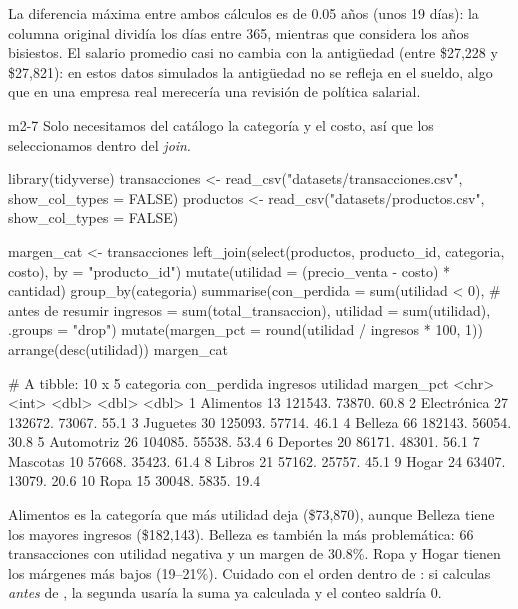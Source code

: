 La diferencia máxima entre ambos cálculos es de 0.05 años (unos 19
días): la columna original dividía los días entre 365, mientras que
 considera los años bisiestos. El salario promedio
casi no cambia con la antigüedad (entre \$27,228 y \$27,821): en estos datos
simulados la antigüedad no se refleja en el sueldo, algo que en una empresa
real merecería una revisión de política salarial.


\begin{solucion}{m2-7}
Solo necesitamos del catálogo la categoría y el costo, así que los
seleccionamos dentro del \emph{join}.
\end{solucion}

\begin{rcode}
library(tidyverse)
transacciones <- read_csv("datasets/transacciones.csv",
                          show_col_types = FALSE)
productos <- read_csv("datasets/productos.csv", show_col_types = FALSE)

margen_cat <- transacciones %
  left_join(select(productos, producto_id, categoria, costo),
            by = "producto_id") %
  mutate(utilidad = (precio_venta - costo) * cantidad) %
  group_by(categoria) %
  summarise(con_perdida = sum(utilidad < 0),   # antes de resumir
            ingresos = sum(total_transaccion),
            utilidad = sum(utilidad),
            .groups = "drop") %
  mutate(margen_pct = round(utilidad / ingresos * 100, 1)) %
  arrange(desc(utilidad))
margen_cat
\end{rcode}
\begin{rsalida}
# A tibble: 10 x 5
   categoria   con_perdida ingresos utilidad margen_pct
   <chr>             <int>    <dbl>    <dbl>      <dbl>
 1 Alimentos            13  121543.   73870.       60.8
 2 Electrónica          27  132672.   73067.       55.1
 3 Juguetes             30  125093.   57714.       46.1
 4 Belleza              66  182143.   56054.       30.8
 5 Automotriz           26  104085.   55538.       53.4
 6 Deportes             20   86171.   48301.       56.1
 7 Mascotas             10   57668.   35423.       61.4
 8 Libros               21   57162.   25757.       45.1
 9 Hogar                24   63407.   13079.       20.6
10 Ropa                 15   30048.    5835.       19.4
\end{rsalida}

Alimentos es la categoría que más utilidad deja (\$73,870), aunque
Belleza tiene los mayores ingresos (\$182,143). Belleza es también la más
problemática: 66 transacciones con utilidad negativa y un margen de 30.8\%.
Ropa y Hogar tienen los márgenes más bajos (19--21\%). Cuidado con el orden
dentro de : si calculas 
\emph{antes} de , la segunda usaría la suma ya
calculada y el conteo saldría 0.


